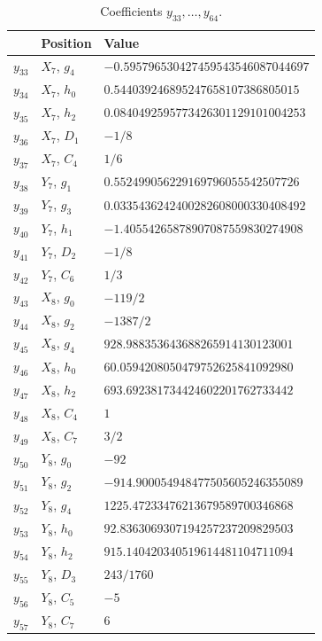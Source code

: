 \documentclass[12pt]{article}
\begin{document}
\begin{table}[H]
\centering\small
\caption{Coefficients $y_{33},\ldots,y_{64}$.}\label{tab:yb}
\begin{tabular}{lll}
\hline
 & Position & Value \\ \hline
$y_{33}$ & $X_{7}$, $g_{4}$ & $-0.595796530427459543546087044697$ \\
$y_{34}$ & $X_{7}$, $h_{0}$ & $0.544039246895247658107386805015$ \\
$y_{35}$ & $X_{7}$, $h_{2}$ & $0.0840492595773426301129101004253$ \\
$y_{36}$ & $X_{7}$, $D_{1}$ & $-1/8$ \\
$y_{37}$ & $X_{7}$, $C_{4}$ & $1/6$ \\
$y_{38}$ & $Y_{7}$, $g_{1}$ & $0.552499056229169796055542507726$ \\
$y_{39}$ & $Y_{7}$, $g_{3}$ & $0.0335436242400282608000330408492$ \\
$y_{40}$ & $Y_{7}$, $h_{1}$ & $-1.40554265878907087559830274908$ \\
$y_{41}$ & $Y_{7}$, $D_{2}$ & $-1/8$ \\
$y_{42}$ & $Y_{7}$, $C_{6}$ & $1/3$ \\
$y_{43}$ & $X_{8}$, $g_{0}$ & $-119/2$ \\
$y_{44}$ & $X_{8}$, $g_{2}$ & $-1387/2$ \\
$y_{45}$ & $X_{8}$, $g_{4}$ & $928.988353643688265914130123001$ \\
$y_{46}$ & $X_{8}$, $h_{0}$ & $60.0594208050479752625841092980$ \\
$y_{47}$ & $X_{8}$, $h_{2}$ & $693.692381734424602201762733442$ \\
$y_{48}$ & $X_{8}$, $C_{4}$ & $1$ \\
$y_{49}$ & $X_{8}$, $C_{7}$ & $3/2$ \\
$y_{50}$ & $Y_{8}$, $g_{0}$ & $-92$ \\
$y_{51}$ & $Y_{8}$, $g_{2}$ & $-914.900054948477505605246355089$ \\
$y_{52}$ & $Y_{8}$, $g_{4}$ & $1225.47233476213679589700346868$ \\
$y_{53}$ & $Y_{8}$, $h_{0}$ & $92.8363069307194257237209829503$ \\
$y_{54}$ & $Y_{8}$, $h_{2}$ & $915.140420340519614481104711094$ \\
$y_{55}$ & $Y_{8}$, $D_{3}$ & $243/1760$ \\
$y_{56}$ & $Y_{8}$, $C_{5}$ & $-5$ \\
$y_{57}$ & $Y_{8}$, $C_{7}$ & $6$ \\

\end{tabular}
\end{table}
\end{document}
